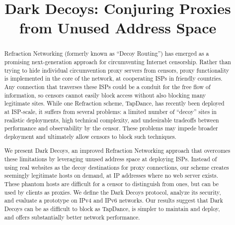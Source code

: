 \documentclass[letterpaper,twocolumn,10pt]{article}
\begin{document}
\date{}

\title{\Large \bf Dark Decoys:
  Conjuring Proxies from Unused Address Space}


\maketitle

\begin{abstract}
Refraction Networking (formerly known as ``Decoy Routing'') has
emerged as a promising next-generation approach for circumventing
Internet censorship. Rather than trying to hide individual
circumvention proxy servers from censors, proxy functionality is
implemented in the core of the network, at cooperating ISPs in
friendly countries.  Any connection that traverses these ISPs could be
a conduit for the free flow of information, so censors cannot easily
block access without also blocking many legitimate sites.  While one
Refraction scheme, TapDance, has recently been deployed at ISP-scale,
it suffers from several problems: a limited number of ``decoy'' sites
in realistic deployments, high technical complexity, and undesirable
tradeoffs between performance and observability by the censor. These
problems may impede broader deployment and ultimately allow censors to
block such techniques.

We present Dark Decoys, an improved Refraction Networking approach
that overcomes these limitations by leveraging unused address space at
deploying ISPs. Instead of using real websites as the decoy destinations
for proxy connections, our scheme creates seemingly legitimate hosts
on demand, at IP addresses where no web server exists.
These phantom hosts are difficult for a censor to distinguish from
ones, but can be used by clients as proxies.  We define the
Dark Decoys protocol, analyze its security, and evaluate a
prototype on IPv4 and IPv6 networks.
Our results suggest that Dark Decoys can be as difficult to block
as TapDance, is simpler to maintain and deploy,
and offers substantially better network performance.

\end{abstract}
\end{document}

